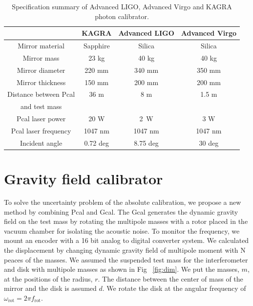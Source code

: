 \documentclass[%
 reprint,
superscriptaddress,
 amsmath,amssymb,
 aps,
]{revtex4-1}
\begin{document}
\begin{table}
\begin{center}
\caption{Specification summary of Advanced LIGO, Advanced Virgo and KAGRA photon calibrator. \label{pcal}}
\footnotesize
\begin{tabular}{cccc}
\hline
& KAGRA& Advanced LIGO& Advanced Virgo \\
\hline
Mirror material & Sapphire & Silica & Silica \\
 Mirror mass & 23 kg & 40 kg & 40 kg \\
  Mirror diameter & 220 mm & 340 mm & 350 mm \\
    Mirror thickness & 150 mm & 200 mm & 200 mm \\
 Distance between Pcal & 36 m & 8 m & 1.5 m \\
and test mass &&& \\
  Pcal laser power & 20 W & 2~W & 3 W \\
  Pcal laser frequency & 1047 nm & 1047 nm &1047 nm\\
  Incident angle& 0.72 deg & 8.75 deg &30 deg \\
  \hline
\end{tabular}
\end{center}
\end{table}

\section{Gravity field calibrator} \label{sec:Gcal}
To solve the uncertainty problem of the absolute calibration, we propose a new method by combining Pcal and Gcal. %
 The Gcal generates the dynamic gravity field on %
the test mass by rotating the multipole masses with a rotor placed in the vacuum chamber for isolating the acoustic noise. To monitor the frequency, we mount an %
encoder with %
a 16 bit analog to digital converter  system.
We calculated the displacement by changing dynamic gravity field of multipole moment with N peaces of the masses.
We assumed the suspended test mass for the interferometer and disk with multipole masses as shown in Fig ~\ref{fig:dim}.
We put the masses, $m$, at the positions of the radius, $r$. The distance between the center of mass of the mirror and the disk is assumed $d$.
We rotate the disk at the angular frequency of $\omega_{\mathrm{rot}}=2\pi f_{\mathrm{rot}}$.
\end{document}
